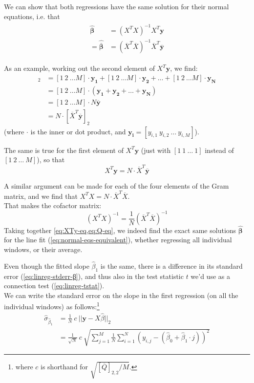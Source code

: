 We can show that both regressions have the same solution for their normal equations, i.e. that
\begin{align} \label{eq:normal-eqs-equivalent}
\begin{split}
    \hat{\bm{β}}
    &= (X^T X)^{-1} X^T \bm{y} \\
    = \hat{\overline{\bm{β}}}
    & = (\overline{X}^T \overline{X})^{-1} \overline{X}^T \overline{\bm{y}}
\end{split}
\end{align}

As an example, working out the second element of $X^T \bm{y}$, we find:
\begin{align}
    [X^T \bm{y}]_2
    &= [1\ 2\ … M] · \bm{y_1} + [1\ 2\ … M] · \bm{y_2} + … + [1\ 2\ … M] · \bm{y_N}  \nonumber \\
    &= [1\ 2\ … M] · (\bm{y_1} + \bm{y_2} + … + \bm{y_N})   \nonumber \\
    &= [1\ 2\ … M] · N \overline{\bm{y}}   \nonumber \\
    &= N · [\overline{X}^T \overline{\bm{y}}]_2
\end{align}
(where $·$ is the inner or dot product, and $\bm{y_i} = [y_{i,1}\ y_{i,2}\ …\ y_{i,M}]$).

The same is true for the first element of $X^T \bm{y}$ (just with $[1\ 1\ …\ 1]$ instead of $[1\ 2\ …\ M]$), so that
\begin{equation} \label{eq:XTy-eq}
    X^T \bm{y} = N · \overline{X}^T \overline{\bm{y}}
\end{equation}

A similar argument can be made for each of the four elements of the Gram matrix, and we find that $X^T X = N · \overline{X}^T \overline{X}$.\\
That makes the cofactor matrix:
\begin{equation} \label{eq:Q-eq}
    (X^T X)^{-1} = \frac{1}{N} (\overline{X}^T \overline{X})^{-1}
\end{equation}
Taking together \cref{eq:XTy-eq,eq:Q-eq}, we indeed find the exact same solutions $\hat{\bm{β}}$ for the line fit (\cref{eq:normal-eqs-equivalent}), whether regressing all individual windows, or their average.

Even though the fitted slope $\hat{β}_1$ is the same, there is a difference in its standard error (\cref{eq:linreg-stderr-β}), and thus also in the test statistic $t$ we'd use as a connection test (\cref{eq:linreg-tstat}).\\
We can write the standard error on the slope in the first regression (on all the individual windows) as follows:\footnote{
    where $c$ is shorthand for $\sqrt{\left[\overline{Q}\right]_{2,2} / M}$.
}
\begin{align}
    \hat{σ}_{\hat{β}_1}
    &= \frac{1}{N}\ c\ || \bm{y} - X \hat{β} ||_2  \\
    &= \frac{1}{\sqrt{N}}\ c\ \sqrt{\sum_{j=1}^M \frac{1}{N}\sum_{i=1}^N
    \left( y_{i,j} - (\hat{β}_0 + \hat{β}_1 · j)  \right)^2 }  \label{eq:stderr-wins}
\end{align}

